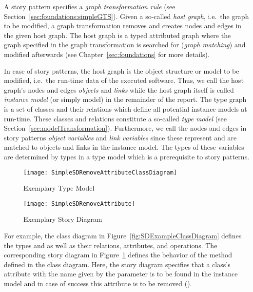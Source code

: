 A story pattern specifies a \emph{graph transformation rule} \cite{Roz97} (see Section~\ref{sec:foundations:simpleGTS}).
Given a so-called \emph{host graph}, i.e.\ the graph to be modified, a graph transformation removes and creates nodes and edges in the given host graph.
The host graph is a typed attributed graph where the graph specified in the graph transformation is searched for (\emph{graph matching}) and modified afterwards
(see Chapter~\ref{sec:foundations} for more details).

In case of story patterns, the host graph is the object structure or model to be modified, i.e.\ the run-time data of the executed software.
Thus, we call the host graph's nodes and edges \emph{objects} and \emph{links}
while the host graph itself is called \emph{instance model} (or simply model) in the remainder of the report.
The type graph is a set of classes and their relations which define all potential instance models at run-time.
These classes and relations constitute a so-called \emph{type model} (see Section~\ref{sec:modelTransformation}).
Furthermore, we call the nodes and edges in story patterns \emph{object variables} and \emph{link variables}
since these represent and are matched to objects and links in the instance model.
The types of these variables are determined by types in a type model which is a prerequisite to story patterns.

\begin{figure}[htb]
	\centering
  \begin{minipage}[t]{.4\textwidth}
    \centering
    \texttt{[image: SimpleSDRemoveAttributeClassDiagram]} 
    \caption{Exemplary Type Model}
    \label{fig:SDExampleClassDiagram}
  \end{minipage}%
  \hfill
  \begin{minipage}[t]{.55\textwidth}
    \centering
    \texttt{[image: SimpleSDRemoveAttribute]}
    \caption{Exemplary Story Diagram}
    \label{fig:SDExampleStoryDiagram}
  \end{minipage}
\end{figure}

For example, the class diagram in Figure~\ref{fig:SDExampleClassDiagram} defines the types  and  as well as their relations, attributes, and operations.
The corresponding story diagram in Figure~\ref{fig:SDExampleStoryDiagram} defines the behavior of the  method defined in the class diagram.
Here, the story diagram specifies that a class's attribute with the name given by the parameter  is to be found in the instance model and in case of success this attribute is to be removed (\destroy).

